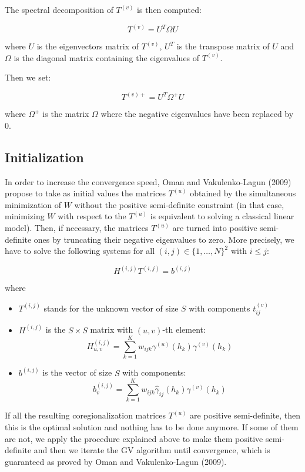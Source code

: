 \documentclass[11pt]{article}
\begin{document}
The spectral decomposition of $T^{(v)}$ is then computed:

\[
T^{(v)} = U^T \Omega U
\]

where $U$ is the eigenvectors matrix of $T^{(v)}$, $U^T$ is the transpose matrix of $U$ and $\Omega$ is the diagonal matrix containing the eigenvalues of $T^{(v)}$.

Then we set:

\[
T^{(v)+} = U^T \Omega^+ U
\]

where $\Omega^+$ is the matrix $\Omega$ where the negative eigenvalues have been replaced by 0.

\subsection{Initialization}

In order to increase the convergence speed, Oman and Vakulenko-Lagun (2009) propose to take as initial values the matrices $T^{(u)}$ obtained by the simultaneous minimization of $W$ without the positive semi-definite constraint (in that case, minimizing $W$ with respect to the $T^{(u)}$ is equivalent to solving a classical linear model). Then, if necessary, the matrices $T^{(u)}$ are turned into positive semi-definite ones by truncating their negative eigenvalues to zero. More precisely, we have to solve the following systems for all $(i,j) \in \{1,\ldots,N\}^2$ with $i \leq j$:

\[
H^{(i,j)} T^{(i,j)} = b^{(i,j)}
\]

where

\begin{itemize}
    \item $T^{(i,j)}$ stands for the unknown vector of size $S$ with components $t_{ij}^{(v)}$
    \item $H^{(i,j)}$ is the $S \times S$ matrix with $(u,v)$-th element:
    \[
    H^{(i,j)}_{u,v} = \sum_{k=1}^K w_{ijk} \gamma^{(u)}(h_k) \gamma^{(v)}(h_k)
    \]
    \item $b^{(i,j)}$ is the vector of size $S$ with components:
    \[
    b^{(i,j)}_v = \sum_{k=1}^K w_{ijk} \hat{\gamma}_{ij}(h_k) \gamma^{(v)}(h_k)
    \]
\end{itemize}

If all the resulting coregionalization matrices $T^{(u)}$ are positive semi-definite, then this is the optimal solution and nothing has to be done anymore. If some of them are not, we apply the procedure explained above to make them positive semi-definite and then we iterate the GV algorithm until convergence, which is guaranteed as proved by Oman and Vakulenko-Lagun (2009).
\end{document}
